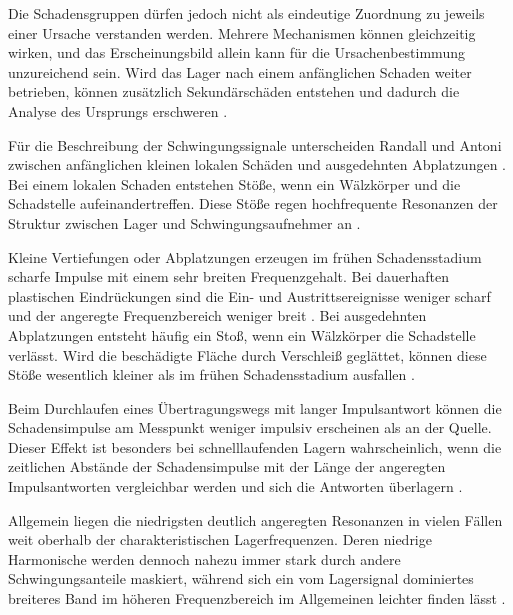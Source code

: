 Die Schadensgruppen dürfen jedoch nicht als eindeutige Zuordnung zu jeweils
einer Ursache verstanden werden. Mehrere Mechanismen können gleichzeitig
wirken, und das Erscheinungsbild allein kann für die Ursachenbestimmung
unzureichend sein. Wird das Lager nach einem anfänglichen Schaden weiter
betrieben, können zusätzlich Sekundärschäden entstehen und dadurch die Analyse
des Ursprungs erschweren
\cite[S.~v und S.~2, Abschn.~4 und Anm.~1 zu Abschn.~3.3]{zotero-item-30}.


Für die Beschreibung der Schwingungssignale unterscheiden Randall und Antoni
zwischen anfänglichen kleinen lokalen
Schäden und ausgedehnten Abplatzungen
\cite[S.~490, Abschn.~2]{randallRollingElementBearing2011a}.
Bei einem lokalen Schaden entstehen Stöße, wenn ein Wälzkörper und die
Schadstelle aufeinandertreffen. Diese Stöße regen hochfrequente Resonanzen der
Struktur zwischen Lager und Schwingungsaufnehmer an
\cite[S.~486, Abschn.~1 und Abb.~1]
{randallRollingElementBearing2011a}.

Kleine Vertiefungen oder Abplatzungen erzeugen im frühen Schadensstadium scharfe
Impulse mit einem sehr breiten Frequenzgehalt. Bei dauerhaften plastischen
Eindrückungen sind die Ein- und Austrittsereignisse weniger scharf und der
angeregte Frequenzbereich weniger breit
\cite[S.~489, Abschn.~2]{randallRollingElementBearing2011a}.
Bei ausgedehnten Abplatzungen entsteht häufig ein Stoß, wenn ein Wälzkörper die
Schadstelle verlässt. Wird die beschädigte Fläche durch Verschleiß geglättet,
können diese Stöße wesentlich kleiner als im frühen Schadensstadium ausfallen
\cite[S.~491, Abschn.~2.2]{randallRollingElementBearing2011a}.

Beim Durchlaufen eines Übertragungswegs mit langer Impulsantwort können die
Schadensimpulse am Messpunkt weniger impulsiv erscheinen als an der Quelle.
Dieser Effekt ist besonders bei schnelllaufenden Lagern wahrscheinlich, wenn die
zeitlichen Abstände der Schadensimpulse mit der Länge der angeregten
Impulsantworten vergleichbar werden und sich die Antworten überlagern
\cite[S.~498 und S.~500, Abschn.~4--4.1]
{randallRollingElementBearing2011a}.

Allgemein liegen die niedrigsten deutlich angeregten Resonanzen in vielen Fällen
weit oberhalb der charakteristischen Lagerfrequenzen. Deren niedrige Harmonische
werden dennoch nahezu immer stark durch andere Schwingungsanteile maskiert,
während sich ein vom Lagersignal dominiertes breiteres Band im höheren
Frequenzbereich im Allgemeinen leichter finden lässt
\cite[S.~488, Abschn.~1]{randallRollingElementBearing2011a}.

